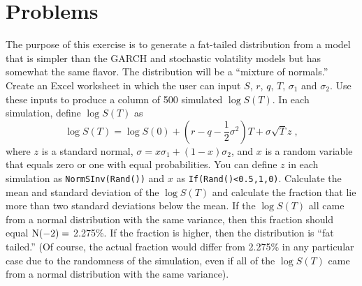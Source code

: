 \section*{Problems}
\begin{prob} \label{e_mixture} The purpose of this exercise is to generate a fat-tailed distribution from a model that is simpler than the GARCH and stochastic volatility models but has somewhat the same flavor.  The distribution will be a ``mixture of normals.'' Create an Excel worksheet in which the user can input $S$, $r$, $q$, $T$, $\sigma_1$ and $\sigma_2$.  Use these inputs to produce a column of 500 simulated $\log S(T)$.  In each simulation, define $\log S(T)$ as
$$\log S(T) = \log S(0) + \left(r-q-\frac{1}{2}\sigma^2\right)T + \sigma \sqrt{T}z\;,$$
where $z$ is a standard normal,
$\sigma = x\sigma_1 + (1-x)\sigma_2$,
and $x$ is a random variable that equals zero or one with equal probabilities.  You can define $z$ in each simulation as
\verb!NormSInv(Rand())! and $x$ as \verb!If(Rand()<0.5,1,0)!. 
Calculate the mean and standard deviation of the $\log S(T)$ and calculate the fraction that lie more than two standard deviations below the mean.  If the $\log S(T)$ all came from a normal distribution with the same variance, then this fraction should equal $\operatorname{N}(-2) = $ 2.275\%.  If the fraction is higher, then the distribution is ``fat tailed.''  (Of course, the actual fraction would differ from 2.275\% in any particular case due to the randomness of the simulation, even if all of the $\log S(T)$ came from a normal distribution with the same variance).
\end{prob}

